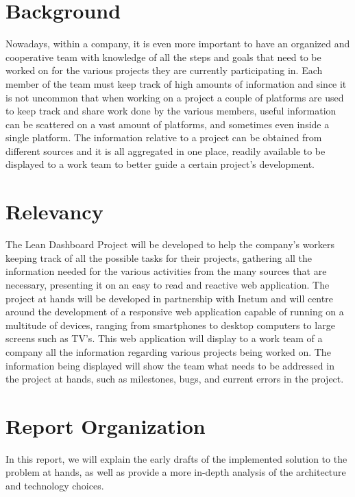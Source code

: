\documentclass[a4paper,twoside,10pt]{report}
\begin{document}
\section{Background}
Nowadays, within a company, it is even more important to have an organized and cooperative team with knowledge of all the steps and goals that need to be worked on for the various projects they are currently participating in.
Each member of the team must keep track of high amounts of information and since it is not uncommon that when working on a project a couple of platforms are used to keep track and share work done by the various members, useful information can be scattered on a vast amount of platforms, and sometimes even inside a single platform.
The information relative to a project can be obtained from different sources and it is all aggregated in one place, readily available to be displayed to a work team to better guide a certain project's development.

\section{Relevancy}
The Lean Dashboard Project will be developed to help the company's workers keeping track of all the possible tasks for their projects, gathering all the information needed for the various activities from the many sources that are necessary, presenting it on an easy to read and reactive web application.
The project at hands will be developed in partnership with Inetum\cite{INETUM} and will centre around the development of a responsive web application capable of running on a multitude of devices, ranging from smartphones to desktop computers to large screens such as TV’s. This web application will display to a work team of a company all the information regarding various projects being worked on. 
The information being displayed will show the team what needs to be addressed in the project at hands, such as milestones, bugs, and current errors in the project.

\section{Report Organization}
In this report, we will explain the early drafts of the implemented solution to the problem at hands, as well as provide a more in-depth analysis of the architecture and technology choices.
\end{document}
